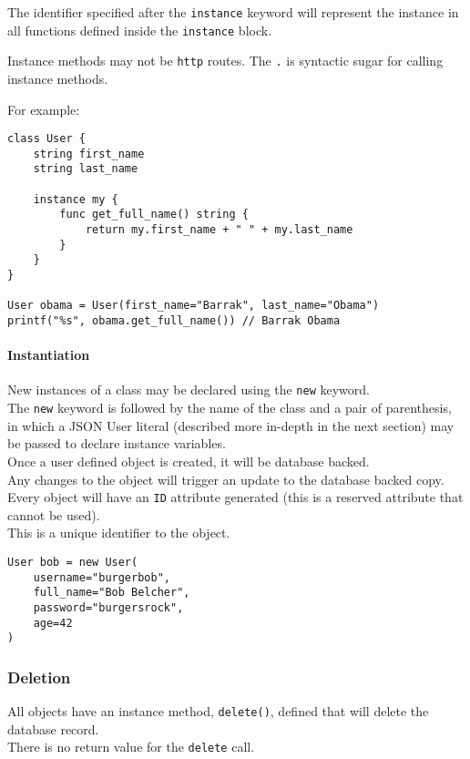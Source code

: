 \documentclass[]{article}
\begin{document}
The identifier specified after the \texttt{instance} keyword will
represent the instance in all functions defined inside the
\texttt{instance} block.

Instance methods may not be \texttt{http} routes. The \texttt{.} is
syntactic sugar for calling instance methods.

For example:

\begin{verbatim}
class User {
    string first_name
    string last_name

    instance my {
        func get_full_name() string {
            return my.first_name + " " + my.last_name
        }
    }
}

User obama = User(first_name="Barrak", last_name="Obama")
printf("%s", obama.get_full_name()) // Barrak Obama
\end{verbatim}

\paragraph{Instantiation}\label{instantiation}

New instances of a class may be declared using the \texttt{new}
keyword.\\The \texttt{new} keyword is followed by the name of the class
and a pair of parenthesis, in which a JSON User literal (described more
in-depth in the next section) may be passed to declare instance
variables.\\Once a user defined object is created, it will be database
backed.\\Any changes to the object will trigger an update to the
database backed copy.\\Every object will have an \texttt{ID} attribute
generated (this is a reserved attribute that cannot be used).\\This is a
unique identifier to the object.

\begin{verbatim}
User bob = new User(
    username="burgerbob",
    full_name="Bob Belcher",
    password="burgersrock",
    age=42
)
\end{verbatim}

\subsubsection{Deletion}\label{deletion}

All objects have an instance method, \texttt{delete()}, defined that
will delete the database record.\\There is no return value for the
\texttt{delete} call.
\end{document}
